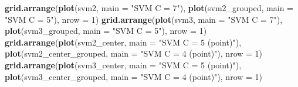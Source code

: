 \documentclass[12pt,twoside]{reedthesis}
\newenvironment{Shaded}{\begin{snugshade}}{\end{snugshade}}
\newcommand{\DataTypeTok}[1]{\textcolor[rgb]{0.13,0.29,0.53}{#1}}
\newcommand{\DecValTok}[1]{\textcolor[rgb]{0.00,0.00,0.81}{#1}}
\newcommand{\KeywordTok}[1]{\textcolor[rgb]{0.13,0.29,0.53}{\textbf{#1}}}
\newcommand{\NormalTok}[1]{#1}
\newcommand{\StringTok}[1]{\textcolor[rgb]{0.31,0.60,0.02}{#1}}
\begin{document}
\begin{Shaded}
\begin{Highlighting}[]
{{{\KeywordTok{grid.arrange}\NormalTok{(}\KeywordTok{plot}\NormalTok{(svm2, }\DataTypeTok{main =} \StringTok{"SVM C = 7"}\NormalTok{),}
             \KeywordTok{plot}\NormalTok{(svm2_grouped, }\DataTypeTok{main =} \StringTok{"SVM C = 5"}\NormalTok{), }\DataTypeTok{nrow =} \DecValTok{1}\NormalTok{)}
\KeywordTok{grid.arrange}\NormalTok{(}\KeywordTok{plot}\NormalTok{(svm3, }\DataTypeTok{main =} \StringTok{"SVM C = 7"}\NormalTok{),}
             \KeywordTok{plot}\NormalTok{(svm3_grouped, }\DataTypeTok{main =} \StringTok{"SVM C = 5"}\NormalTok{), }\DataTypeTok{nrow =} \DecValTok{1}\NormalTok{)}
\KeywordTok{grid.arrange}\NormalTok{(}\KeywordTok{plot}\NormalTok{(svm2_center, }\DataTypeTok{main =} \StringTok{"SVM C = 5 (point)"}\NormalTok{),}
             \KeywordTok{plot}\NormalTok{(svm2_center_grouped, }\DataTypeTok{main =} \StringTok{"SVM C = 4 (point)"}\NormalTok{), }\DataTypeTok{nrow =} \DecValTok{1}\NormalTok{)}
\KeywordTok{grid.arrange}\NormalTok{(}\KeywordTok{plot}\NormalTok{(svm3_center, }\DataTypeTok{main =} \StringTok{"SVM C = 5 (point)"}\NormalTok{),}
             \KeywordTok{plot}\NormalTok{(svm3_center_grouped, }\DataTypeTok{main =} \StringTok{"SVM C = 4 (point)"}\NormalTok{), }\DataTypeTok{nrow =} \DecValTok{1}\NormalTok{)}

}}}
\end{Highlighting}
\end{Shaded}
\end{document}
